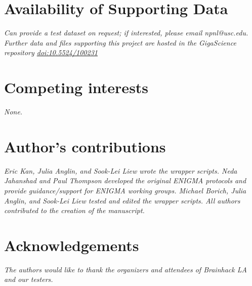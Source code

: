 \documentclass[twocolumn]{bmcart}%
\begin{document}
\begin{backmatter}

\section*{Availability of Supporting Data}
\emph{Can provide a test dataset on request; if interested, please email npnl@usc.edu. Further data and files supporting this project are hosted in the \textit{GigaScience} repository \href{http://gigadb.org/dataset/100231}{doi:10.5524/100231}} 

\section*{Competing interests}
\emph{None.}

\section*{Author's contributions}
\emph{Eric Kan, Julia Anglin, and Sook-Lei Liew wrote the wrapper scripts. Neda Jahanshad and Paul Thompson developed the original ENIGMA protocols and provide guidance/support for ENIGMA working groups. Michael Borich, Julia Anglin, and Sook-Lei Liew tested and edited the wrapper scripts. All authors contributed to the creation of the manuscript.}

\section*{Acknowledgements}
\emph{The authors would like to thank the organizers and attendees of Brainhack LA and our testers.}

  
  



\end{backmatter}
\end{document}
